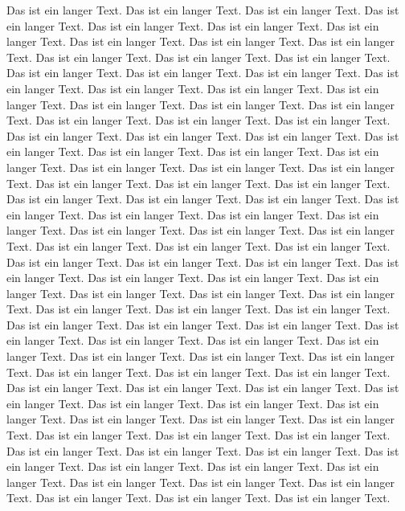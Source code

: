 \documentclass{article}
\begin{document}
Das ist ein langer Text. Das ist ein langer Text.
Das ist ein langer Text. Das ist ein langer Text.
Das ist ein langer Text. Das ist ein langer Text.
Das ist ein langer Text. Das ist ein langer Text.
Das ist ein langer Text. Das ist ein langer Text.
Das ist ein langer Text. Das ist ein langer Text.
Das ist ein langer Text. Das ist ein langer Text.
Das ist ein langer Text. Das ist ein langer Text.
Das ist ein langer Text. Das ist ein langer Text.
Das ist ein langer Text. Das ist ein langer Text.
Das ist ein langer Text. Das ist ein langer Text.
Das ist ein langer Text. Das ist ein langer Text.
Das ist ein langer Text. Das ist ein langer Text.
Das ist ein langer Text. Das ist ein langer Text.
Das ist ein langer Text. Das ist ein langer Text.
Das ist ein langer Text. Das ist ein langer Text.
Das ist ein langer Text. Das ist ein langer Text.
Das ist ein langer Text. Das ist ein langer Text.
Das ist ein langer Text. Das ist ein langer Text.
Das ist ein langer Text. Das ist ein langer Text.
Das ist ein langer Text. Das ist ein langer Text.
Das ist ein langer Text. Das ist ein langer Text.
Das ist ein langer Text. Das ist ein langer Text.
Das ist ein langer Text. Das ist ein langer Text.
Das ist ein langer Text. Das ist ein langer Text.
Das ist ein langer Text. Das ist ein langer Text.
Das ist ein langer Text. Das ist ein langer Text.
Das ist ein langer Text. Das ist ein langer Text.
Das ist ein langer Text. Das ist ein langer Text.
Das ist ein langer Text. Das ist ein langer Text.
Das ist ein langer Text. Das ist ein langer Text.
Das ist ein langer Text. Das ist ein langer Text.
Das ist ein langer Text. Das ist ein langer Text.
Das ist ein langer Text. Das ist ein langer Text.
Das ist ein langer Text. Das ist ein langer Text.
Das ist ein langer Text. Das ist ein langer Text.
Das ist ein langer Text. Das ist ein langer Text.
Das ist ein langer Text. Das ist ein langer Text.
Das ist ein langer Text. Das ist ein langer Text.
Das ist ein langer Text. Das ist ein langer Text.
Das ist ein langer Text. Das ist ein langer Text.
Das ist ein langer Text. Das ist ein langer Text.
Das ist ein langer Text. Das ist ein langer Text.
Das ist ein langer Text. Das ist ein langer Text.
Das ist ein langer Text. Das ist ein langer Text.
Das ist ein langer Text. Das ist ein langer Text.
Das ist ein langer Text. Das ist ein langer Text.
Das ist ein langer Text. Das ist ein langer Text.
Das ist ein langer Text. Das ist ein langer Text.
Das ist ein langer Text. Das ist ein langer Text.
Das ist ein langer Text. Das ist ein langer Text.
Das ist ein langer Text. Das ist ein langer Text.
\end{document}
